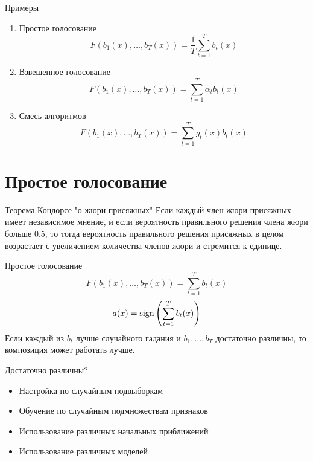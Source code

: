 \documentclass[10pt]{beamer}
\begin{document}
\begin{frame}{Примеры}
  \begin{enumerate}
    \item Простое голосование\\
      $$F(b_1(x), \dots, b_T(x)) = \frac{1}{T}\sum\limits_{t=1}^{T} b_t(x)$$
    \item Взвешенное голосование\\
      $$F(b_1(x), \dots, b_T(x)) = \sum\limits_{t=1}^{T} \alpha_t b_t(x)$$
    \item Смесь алгоритмов\\
      $$F(b_1(x), \dots, b_T(x)) = \sum\limits_{t=1}^{T} g_t(x) b_t(x)$$      
  \end{enumerate}
\end{frame}

\section{Простое голосование}

\begin{frame}{Теорема Кондорсе "о жюри присяжных"}
  Если каждый член жюри присяжных имеет независимое мнение, и если вероятность правильного решения члена жюри больше 0.5, то тогда вероятность правильного решения присяжных в целом возрастает с увеличением количества членов жюри и стремится к единице.   
\end{frame}


\begin{frame}{Простое голосование}
  $$F(b_1(x), \dots, b_T(x)) = \sum\limits_{t=1}^{T} b_t(x)$$
  \bigbreak
  \pause
  $$a(x) = \operatorname{sign} \left( \sum\limits_{t=1}^{T} b_t(x) \right)$$
  \bigbreak
  \pause
  Если каждый из $b_t$ лучше случайного гадания и $b_1, \dots, b_T$ достаточно различны, то композиция может работать лучше.
\end{frame}

\begin{frame}{Достаточно различны?}
  \begin{itemize}
    \item Настройка по случайным подвыборкам
    \item Обучение по случайным подмножествам признаков
    \item Использование различных начальных приближений 
    \item Использование различных моделей
  \end{itemize}
\end{frame}
\end{document}
